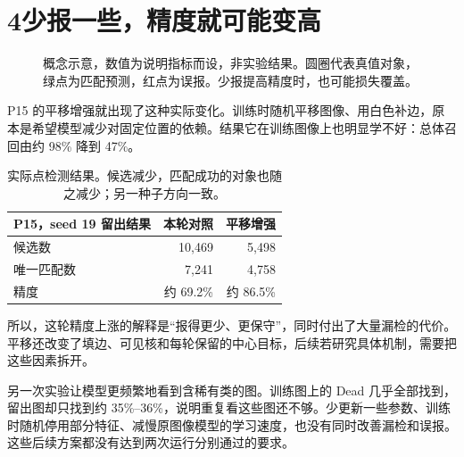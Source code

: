 \documentclass[UTF8,zihao=-4,fontset=windows]{ctexart}
\newcommand{\pagelead}[2]{\section*{#1}\noindent{\large\color{teal}#2}\par\medskip}
\begin{document}
\newpage
\pagelead{4\quad 少报一些，精度就可能变高}{一张更干净的结果图，也可能漏得更多。}
\begin{figure}[H]\centering
{}
\caption{概念示意，数值为说明指标而设，非实验结果。圆圈代表真值对象，绿点为匹配预测，红点为误报。少报提高精度时，也可能损失覆盖。}
\end{figure}

P15 的平移增强就出现了这种实际变化。训练时随机平移图像、用白色补边，原本是希望模型减少对固定位置的依赖。结果它在训练图像上也明显学不好：总体召回由约 98\% 降到 47\%。

\begin{table}[H]\centering\small
\begin{tabular}{lrr}\toprule
P15，seed 19 留出结果 & 本轮对照 & 平移增强\\\midrule
候选数 & 10,469 & 5,498\\
唯一匹配数 & 7,241 & 4,758\\
精度 & 约 69.2\% & 约 86.5\%\\\bottomrule
\end{tabular}
\caption{实际点检测结果。候选减少，匹配成功的对象也随之减少；另一种子方向一致。}
\end{table}

所以，这轮精度上涨的解释是“报得更少、更保守”，同时付出了大量漏检的代价。平移还改变了填边、可见核和每轮保留的中心目标，后续若研究具体机制，需要把这些因素拆开。

另一次实验让模型更频繁地看到含稀有类的图。训练图上的 Dead 几乎全部找到，留出图却只找到约 35\%--36\%，说明重复看这些图还不够。少更新一些参数、训练时随机停用部分特征、减慢原图像模型的学习速度，也没有同时改善漏检和误报。这些后续方案都没有达到两次运行分别通过的要求。
\end{document}
